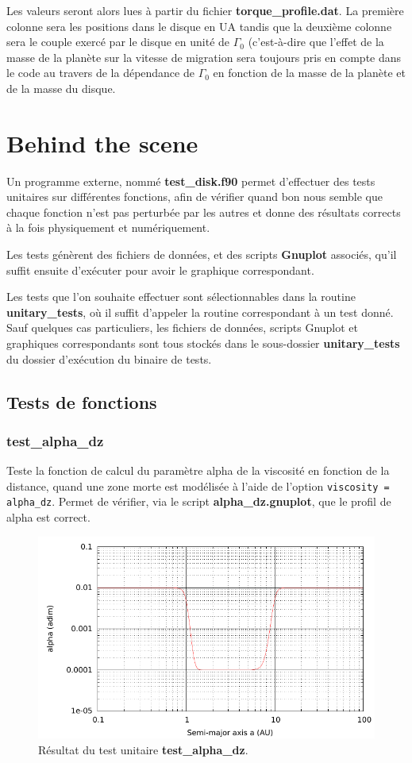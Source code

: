 Les valeurs seront alors lues à partir du fichier \textbf{torque\_profile.dat}. La première colonne sera les positions dans le disque en \unit{UA} tandis que la deuxième colonne sera le couple exercé par le disque en unité de $\Gamma_0$ (c'est-à-dire que l'effet de la masse de la planète sur la vitesse de migration sera toujours pris en compte dans le code au travers de la dépendance de $\Gamma_0$ en fonction de la masse de la planète et de la masse du disque.

\section{Behind the scene}\label{sec:unitary_tests}
Un programme externe, nommé \textbf{test\_disk.f90} permet d'effectuer des tests unitaires sur différentes fonctions, afin de vérifier quand bon nous semble que chaque fonction n'est pas perturbée par les autres et donne des résultats corrects à la fois physiquement et numériquement.

Les tests génèrent des fichiers de données, et des scripts \textbf{Gnuplot} associés, qu'il suffit ensuite d'exécuter pour avoir le graphique correspondant. 

Les tests que l'on souhaite effectuer sont sélectionnables dans la routine \textbf{unitary\_tests}, où il suffit d'appeler la routine correspondant à un test donné. Sauf quelques cas particuliers, les fichiers de données, scripts Gnuplot et graphiques correspondants sont tous stockés dans le sous-dossier \textbf{unitary\_tests} du dossier d'exécution du binaire de tests.

\subsection{Tests de fonctions}
\subsubsection{test\_alpha\_dz}
Teste la fonction de calcul du paramètre alpha de la viscosité en fonction de la distance, quand une zone morte est modélisée à l'aide de l'option \verb|viscosity = alpha_dz|. Permet de vérifier, via le script \textbf{alpha\_dz.gnuplot}, que le profil de alpha est correct.


\begin{figure}[htbp]
\centering
\includegraphics[width=0.65\linewidth]{figure/unitary_tests/alpha_dz.pdf}
\caption{Résultat du test unitaire \textbf{test\_alpha\_dz}.}
\end{figure}

